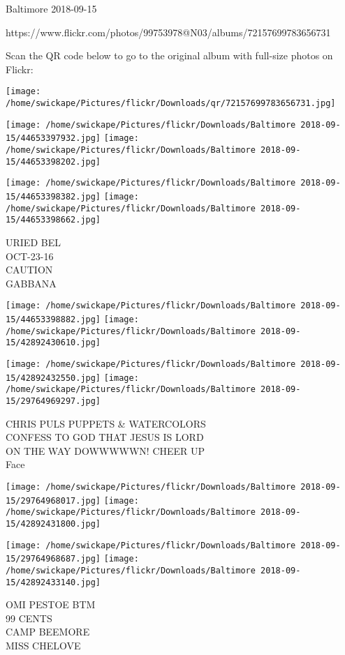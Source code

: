\documentclass[10pt,letterpaper]{article}
\begin{document}
Baltimore 2018-09-15

https://www.flickr.com/photos/99753978@N03/albums/72157699783656731

Scan the QR code below to go to the original album with full-size photos on Flickr:

\texttt{[image: /home/swickape/Pictures/flickr/Downloads/qr/72157699783656731.jpg]}
\pagebreak

\texttt{[image: /home/swickape/Pictures/flickr/Downloads/Baltimore 2018-09-15/44653397932.jpg]}
\texttt{[image: /home/swickape/Pictures/flickr/Downloads/Baltimore 2018-09-15/44653398202.jpg]}

\texttt{[image: /home/swickape/Pictures/flickr/Downloads/Baltimore 2018-09-15/44653398382.jpg]}
\texttt{[image: /home/swickape/Pictures/flickr/Downloads/Baltimore 2018-09-15/44653398662.jpg]}

URIED BEL\\
OCT{-}23{-}16\\
CAUTION\\
GABBANA
\pagebreak

\texttt{[image: /home/swickape/Pictures/flickr/Downloads/Baltimore 2018-09-15/44653398882.jpg]}
\texttt{[image: /home/swickape/Pictures/flickr/Downloads/Baltimore 2018-09-15/42892430610.jpg]}

\texttt{[image: /home/swickape/Pictures/flickr/Downloads/Baltimore 2018-09-15/42892432550.jpg]}
\texttt{[image: /home/swickape/Pictures/flickr/Downloads/Baltimore 2018-09-15/29764969297.jpg]}

CHRIS PULS PUPPETS \& WATERCOLORS\\
CONFESS TO GOD THAT JESUS IS LORD\\
ON THE WAY DOWWWWWN!  CHEER UP\\
Face
\pagebreak

\texttt{[image: /home/swickape/Pictures/flickr/Downloads/Baltimore 2018-09-15/29764968017.jpg]}
\texttt{[image: /home/swickape/Pictures/flickr/Downloads/Baltimore 2018-09-15/42892431800.jpg]}

\texttt{[image: /home/swickape/Pictures/flickr/Downloads/Baltimore 2018-09-15/29764968687.jpg]}
\texttt{[image: /home/swickape/Pictures/flickr/Downloads/Baltimore 2018-09-15/42892433140.jpg]}

OMI PESTOE BTM\\
99 CENTS\\
CAMP BEEMORE\\
MISS CHELOVE
\pagebreak
\end{document}
